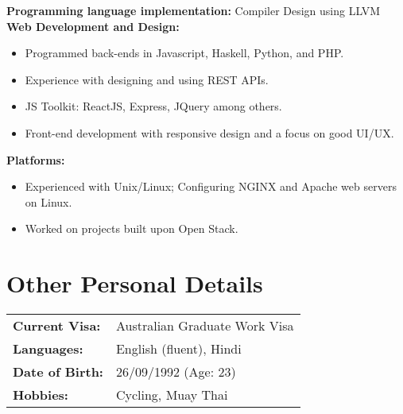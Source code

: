 \documentclass[a4paper,overlapped]{res}
\begin{document}
\begin{resume}
  \textbf{Programming language implementation:} Compiler Design using LLVM \\
  \textbf{Web Development and Design:}
  \begin{itemize}
  \item Programmed back-ends in Javascript, Haskell, Python, and PHP.
  \item Experience with designing and using REST APIs.
  \item JS Toolkit: ReactJS, Express, JQuery among
    others.
  \item Front-end development with responsive design and a focus on good UI/UX.
  \end{itemize}
  \textbf{Platforms:}
  \begin{itemize}
  \item Experienced with Unix/Linux; Configuring NGINX and Apache web servers on
    Linux.
  \item Worked on projects built upon Open Stack.
  \end{itemize}


  



  \section{Other Personal Details}
  \begin{tabular}{l l}
    \textbf{Current Visa:} & Australian Graduate Work Visa \\
    \textbf{Languages:} & English (fluent), Hindi \\
    \textbf{Date of Birth: } & 26/09/1992 (Age: 23) \\ 
    \textbf{Hobbies:} & Cycling, Muay Thai \\
  \end{tabular}

  
\end{resume}
\end{document}
